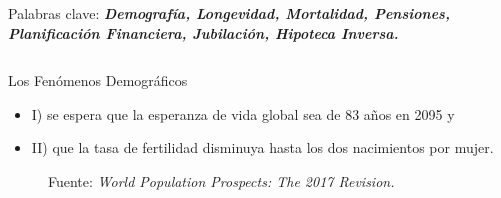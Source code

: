 \documentclass[]{beamer}
\begin{document}
\begin{frame}{\vspace{1ex}\hfill Palabras clave: \bfseries \textit{Demograf\'ia, Longevidad, Mortalidad, Pensiones, Planificaci\'on Financiera, Jubilaci\'on, Hipoteca Inversa.}}
\begin{columns}[t]
\begin{block}{Los Fen\'omenos Demogr\'aficos}
\begin{multicols}{2}
				\begin{itemize}
					\item I) se espera que la esperanza de vida global sea de 83 a\~nos en 2095 y
					\item II) que la tasa de fertilidad disminuya hasta los dos nacimientos por mujer.
				\end{itemize}
				\vspace{-0.3cm}
				\begin{figure}[h]
					\centering
					\caption{\small Fuente: \textit{World Population Prospects: The 2017 Revision.}}
					\label{esperanza}
				\end{figure}


\end{multicols}
\end{block}
\end{columns}
\end{frame}
\end{document}
